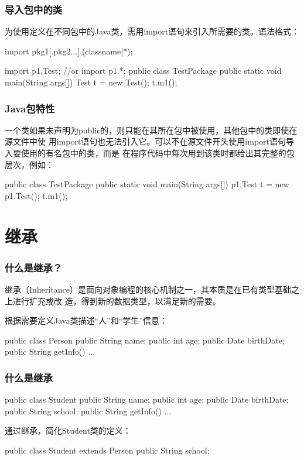 \begin{frame}[fragile] %
\frametitle{导入包中的类}

为使用定义在不同包中的Java类，需用import语句来引入所需要的类。语法格式：
\begin{javaCode}
import pkg1[.pkg2...].(classname|*);  
\end{javaCode}

\begin{javaCode}
  import p1.Test; //or import p1.*;
  public class TestPackage{
    public static void main(String args[]){
      Test t = new Test();
      t.m1();
    }
  }
\end{javaCode}

\end{frame}

\begin{frame}[fragile] %
\frametitle{Java包特性}

{\hei 一个类如果未声明为public的，则只能在其所在包中被使用}，其他包中的类即使在源文件中使
用import语句也无法引入它。可以不在源文件开头使用import语句导入要使用的有名包中的类，而是
在程序代码中每次用到该类时都给出其完整的包层次，例如：
\begin{javaCode}
  public class TestPackage{ 
    public static void main(String args[]){ 
      p1.Test t = new p1.Test(); 
      t.m1(); 
    } 
  }
\end{javaCode}
\end{frame}

\section{继承}

\begin{frame}[fragile] %
\frametitle{什么是继承？}

继承（Inheritance）是面向对象编程的核心机制之一，其本质是在已有类型基础之上进行扩充或改
造，得到新的数据类型，以满足新的需要。

根据需要定义Java类描述“人”和“学生”信息：
\begin{javaCode}
  public class Person {
    public String name;
    public int age;
    public Date birthDate;
    public String getInfo() {...}
  }
\end{javaCode}
\end{frame}

\begin{frame}[fragile] %
\frametitle{什么是继承}

\begin{javaCode}
  public class Student {
    public String name;
    public int age;
    public Date birthDate;
    public String school;
    public String getInfo() {...}
  }
\end{javaCode}

通过继承，简化Student类的定义：
\begin{javaCode}
  public class Student extends Person {
    public String school;
  }
\end{javaCode}
\end{frame}

